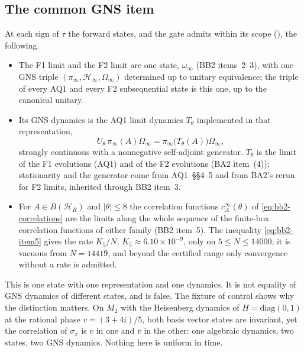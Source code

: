 \subsection{The common GNS item}
\label{sec:bc1-gns}
At each sign of $\tau$ the forward states, and the gate admits within its
scope (), the following.
\begin{itemize}
\item The F1 limit and the F2 limit are one state, $\omega_\infty$ (BB2
 items~2--3), with one GNS triple $(\pi_\infty,\mathcal H_\infty,\Omega_\infty)$
 determined up to unitary equivalence; the triple of every AQ1 and every F2
 subsequential state is this one, up to the canonical unitary.
\item Its GNS dynamics is the AQ1 limit dynamics $T_\theta$ implemented in
 that representation,
 \begin{equation}
 U_\theta\,\pi_\infty(A)\Omega_\infty=\pi_\infty\bigl(T_\theta(A)\bigr)\Omega_\infty ,
 \label{eq:bc1-gns}
 \end{equation}
 strongly continuous with a nonnegative self-adjoint generator. $T_\theta$ is
 the limit of the F1 evolutions (AQ1) and of the F2 evolutions (BA2
 item~(4)); stationarity and the generator come from AQ1~\S\S4--5 and from
 BA2's rerun for F2 limits, inherited through BB2 item~3.
\item For $A\in B(\mathcal H_R)$ and $|\theta|\le8$ the correlation functions
 $c^\infty_A(\theta)$ of \eqref{eq:bb2-correlations} are the limits along the
 whole sequence of the finite-box correlation functions of either family
 (BB2 item~5). The inequality \eqref{eq:bb2-item5} gives the rate $K_5/N$,
 $K_5\approx6.10\times10^{-9}$, only on $5\le N\le14000$; it is vacuous from
 $N=14419$, and beyond the certified range only convergence without a rate is
 admitted.
\end{itemize}
This is one state with one representation and one dynamics. It is not
equality of GNS dynamics of different states, and
 is false. The fixture of control
 shows why the distinction matters. On
$M_2$ with the Heisenberg dynamics of $H=\mathrm{diag}(0,1)$ at the rational
phase $v=(3+4i)/5$, both basis vector states are invariant, yet the
correlation of $\sigma_x$ is $v$ in one and $\bar v$ in the other: one
algebraic dynamics, two states, two GNS dynamics. Nothing here is uniform in
time.

